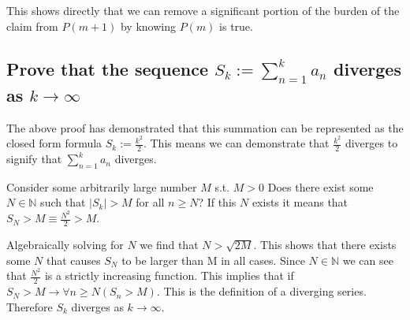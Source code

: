 \documentclass{article}
\begin{document}
This shows directly that we can remove a significant portion of the burden of the claim from $P(m+1)$ by knowing $P(m)$ is true.

\subsection{Prove that the sequence $S_k := \sum_{n=1}^k a_n$ diverges as $k \rightarrow \infty$}
The above proof has demonstrated  that this summation can be represented as the closed form formula $S_k := \frac{k^2}{2}$. This means we can demonstrate that $\frac{k^2}{2}$ diverges to signify that $\sum_{n=1}^k a_n$ diverges.

Consider some arbitrarily large number $M$ s.t. $M > 0$ Does there exist some $N \in \mathbb{N}$ such that $|S_k| > M$ for all $n \geq N$? If this $N$ exists it means that $S_N > M \equiv \frac{N^2}{2} > M$.

Algebraically solving for $N$ we find that $N > \sqrt{2M}$. This shows that there exists some $N$ that causes $S_N$ to be larger than M in all cases. Since $N \in \mathbb{N}$ we can see that $\frac{N^2}{2}$ is a strictly increasing function. This implies that if $S_N > M \rightarrow \forall n \geq N (S_n > M)$. This is the definition of a diverging series. Therefore $S_k$ diverges as $k \rightarrow \infty$.
\end{document}
